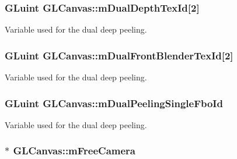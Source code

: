 \hypertarget{class_g_l_canvas_a379e8f67bbbe059c0f4e6ebb50f7eefd}{
\subsubsection[{m\+Dual\+Depth\+Tex\+Id}]{\setlength{\rightskip}{0pt plus 5cm}G\+Luint G\+L\+Canvas\+::m\+Dual\+Depth\+Tex\+Id\mbox{[}2\mbox{]}\hspace{0.3cm}{\ttfamily [private]}}}\label{class_g_l_canvas_a379e8f67bbbe059c0f4e6ebb50f7eefd}


Variable used for the dual deep peeling. 

\hypertarget{class_g_l_canvas_a204cdcacc1b89bf9b0e8b64f577f1a11}{
\subsubsection[{m\+Dual\+Front\+Blender\+Tex\+Id}]{\setlength{\rightskip}{0pt plus 5cm}G\+Luint G\+L\+Canvas\+::m\+Dual\+Front\+Blender\+Tex\+Id\mbox{[}2\mbox{]}\hspace{0.3cm}{\ttfamily [private]}}}\label{class_g_l_canvas_a204cdcacc1b89bf9b0e8b64f577f1a11}


Variable used for the dual deep peeling. 

\hypertarget{class_g_l_canvas_ad96b247e24596c3b7bcf8e304db293e2}{
\subsubsection[{m\+Dual\+Peeling\+Single\+Fbo\+Id}]{\setlength{\rightskip}{0pt plus 5cm}G\+Luint G\+L\+Canvas\+::m\+Dual\+Peeling\+Single\+Fbo\+Id\hspace{0.3cm}{\ttfamily [private]}}}\label{class_g_l_canvas_ad96b247e24596c3b7bcf8e304db293e2}


Variable used for the dual deep peeling. 

\hypertarget{class_g_l_canvas_a819693fdcfb9caccfa7b368edc3613c6}{
\subsubsection[{m\+Free\+Camera}]{$\ast$ G\+L\+Canvas\+::m\+Free\+Camera\hspace{0.3cm}{\ttfamily [private]}}}\label{class_g_l_canvas_a819693fdcfb9caccfa7b368edc3613c6}


